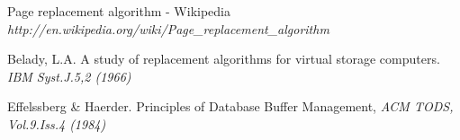 \begin{thebibliography}{2}

 Page replacement algorithm - Wikipedia
\textit{http://en.wikipedia.org/wiki/Page\_replacement\_algorithm}

 Belady, L.A. 
A study of replacement algorithms for virtual storage computers. 
\textit{IBM Syst.J.5,2 (1966)}

 Effelssberg \& Haerder.
Principles of Database Buffer Management, 
\textit{ACM TODS, Vol.9.Iss.4 (1984)}
 
\end{thebibliography}